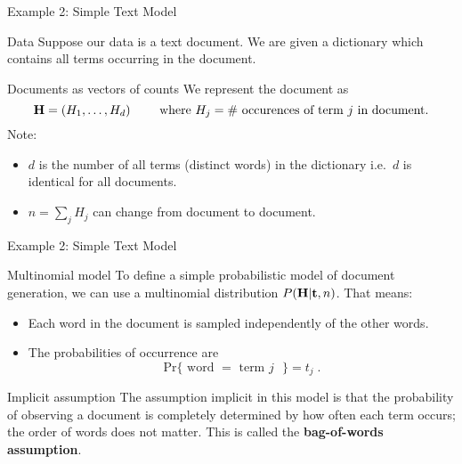 \documentclass[dvipsnames,mathserif]{beamer}
\def\ie{i.e.\ }
\begin{document}
{\begin{frame}{Example 2: Simple Text Model}
  \begin{block}{Data}
    Suppose our data is a text document. We are given a dictionary which contains all terms occurring in the document.
  \end{block}
  \begin{block}{Documents as vectors of counts}
    We represent the document as
    \begin{equation*}
      \mathbf{H}=(H_{1},\ldots,H_{d})
      \qquad
      \text{ where }
      H_{j}=\#\text{ occurences of term $j$ in document.}
    \end{equation*}
    Note: \begin{itemize}
    \item $d$ is the number of all terms (distinct words) in the dictionary
      \ie $d$ is identical for all documents.
    \item $n=\sum_j H_j$ can change from document to document.
    \end{itemize}
  \end{block}
\end{frame}


\begin{frame}{Example 2: Simple Text Model}
  \begin{block}{Multinomial model}
    To define a simple probabilistic model of document generation, we 
    can use a multinomial distribution $P(\mathbf{H}|\mathbf{t},n)$. That means:
    \begin{itemize}
    \item Each word in the document is sampled independently of the other words.
    \item The probabilities of occurrence are
      \begin{equation*}
        \mbox{Pr}\lbrace \text{ word } = \text{ term $j$ }\rbrace = t_j\;.
      \end{equation*}
    \end{itemize}
  \end{block}
  \begin{block}{Implicit assumption}
    The assumption implicit in this model is that the probability of observing a document
    is completely determined by how often each term occurs;  the order of words
    does not matter. This is called the \textbf{bag-of-words
      assumption}.
  \end{block}
\end{frame}

}
\end{document}
